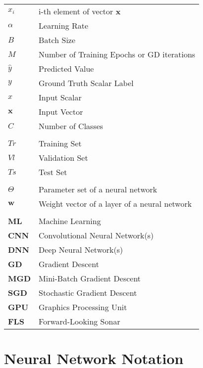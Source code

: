 \documentclass[a4paper, notoc, oneside, openany]{tufte-book} %
\begin{document}
\begin{longtable}[c]{ll}
	
	$x_i$			& i-th element of vector $\textbf{x}$\\
	
	$\alpha$   		& Learning Rate\\
	$B$				& Batch Size\\
	$M$				& Number of Training Epochs or GD iterations\\
	
	$\hat{y}$		& Predicted Value\\
	$y$				& Ground Truth Scalar Label\\
	$x$				& Input Scalar\\
	$\textbf{x}$	& Input Vector\\
	$C$				& Number of Classes\\
					&   \\
	$Tr$			& Training Set\\
	$Vl$			& Validation Set\\
	$Ts$			& Test Set\\
					&   \\
	$\Theta$		& Parameter set of a neural network\\
	$\textbf{w}$	& Weight vector of a layer of a neural network\\
					&	\\
	\textbf{ML}		& Machine Learning\\			
	\textbf{CNN}	& Convolutional Neural Network(s)\\
	\textbf{DNN}	& Deep Neural Network(s)\\
	
	\textbf{GD}		& Gradient Descent\\
    \textbf{MGD}	& Mini-Batch Gradient Descent\\
	\textbf{SGD}	& Stochastic Gradient Descent\\
	
	\textbf{GPU}	& Graphics Processing Unit\\
	
	\textbf{FLS}	& Forward-Looking Sonar\\
	
\end{longtable}

\chapter{Neural Network Notation}
\end{document}

